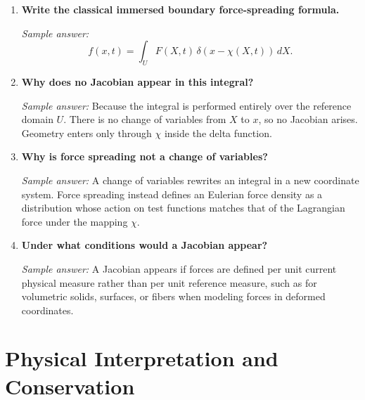 \documentclass[11pt]{article}
\begin{document}
\begin{enumerate}[label=\arabic*., resume]

\item \textbf{Write the classical immersed boundary force-spreading formula.}

\textit{Sample answer:}
\[
f(x,t) = \int_U F(X,t)\,\delta(x-\chi(X,t))\,dX.
\]

\item \textbf{Why does no Jacobian appear in this integral?}

\textit{Sample answer:}  
Because the integral is performed entirely over the reference domain $U$. There is no change of variables from $X$ to $x$, so no Jacobian arises. Geometry enters only through $\chi$ inside the delta function.

\item \textbf{Why is force spreading not a change of variables?}

\textit{Sample answer:}  
A change of variables rewrites an integral in a new coordinate system. Force spreading instead defines an Eulerian force density as a distribution whose action on test functions matches that of the Lagrangian force under the mapping $\chi$.

\item \textbf{Under what conditions would a Jacobian appear?}

\textit{Sample answer:}  
A Jacobian appears if forces are defined per unit current physical measure rather than per unit reference measure, such as for volumetric solids, surfaces, or fibers when modeling forces in deformed coordinates.

\end{enumerate}

\section*{Physical Interpretation and Conservation}
\end{document}
